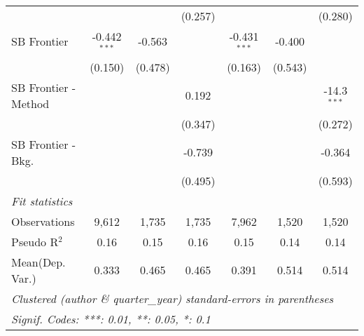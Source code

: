 \begin{tabular}{lcccccc}
                        &                &         & (0.257) &                &         & (0.280)\\   
   SB Frontier          & -0.442$^{***}$ & -0.563  &         & -0.431$^{***}$ & -0.400  &   \\   
                        & (0.150)        & (0.478) &         & (0.163)        & (0.543) &   \\   
   SB Frontier - Method &                &         & 0.192   &                &         & -14.3$^{***}$\\   
                        &                &         & (0.347) &                &         & (0.272)\\   
   SB Frontier - Bkg.   &                &         & -0.739  &                &         & -0.364\\   
                        &                &         & (0.495) &                &         & (0.593)\\   
   \midrule
   \emph{Fit statistics}\\
   Observations         & 9,612          & 1,735   & 1,735   & 7,962          & 1,520   & 1,520\\  
   Pseudo R$^2$         & 0.16           & 0.15    & 0.16    & 0.15           & 0.14    & 0.14\\  
Mean(Dep. Var.) & 0.333 & 0.465 & 0.465 & 0.391 & 0.514 & 0.514 \\
   \midrule \midrule
   \multicolumn{7}{l}{\emph{Clustered (author \& quarter\_year) standard-errors in parentheses}}\\
   \multicolumn{7}{l}{\emph{Signif. Codes: ***: 0.01, **: 0.05, *: 0.1}}\\
\end{tabular}
\par\endgroup
